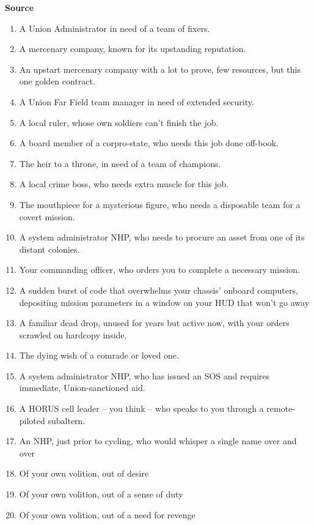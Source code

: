\textbf{Source}
\begin{enumerate}
    \item A Union Administrator in need of a team of fixers.
    \item A mercenary company, known for its upstanding reputation.
    \item An upstart mercenary company with a lot to prove, few resources, but this one golden contract.
    \item A Union Far Field team manager in need of extended security.
    \item A local ruler, whose own soldiers can’t finish the job.
    \item A board member of a corpro-state, who needs this job done off-book.
    \item The heir to a throne, in need of a team of champions.
    \item A local crime boss, who needs extra muscle for this job.
    \item The mouthpiece for a mysterious figure, who needs a disposable team for a covert mission.
    \item A system administrator NHP, who needs to procure an asset from one of its distant colonies.
    \item Your commanding officer, who orders you to complete a necessary mission.
    \item A sudden burst of code that overwhelms your chassis’ onboard computers, depositing mission parameters in a window on your HUD that won’t go away
    \item A familiar dead drop, unused for years but active now, with your orders scrawled on hardcopy inside.
    \item The dying wish of a comrade or loved one.
    \item A system administrator NHP, who has issued an SOS and requires immediate, Union-sanctioned aid.
    \item A HORUS cell leader -- you think -- who speaks to you through a remote-piloted subaltern.
    \item An NHP, just prior to cycling, who would whisper a single name over and over
    \item Of your own volition, out of desire
    \item Of your own volition, out of a sense of duty
    \item Of your own volition, out of a need for revenge
\end{enumerate}

